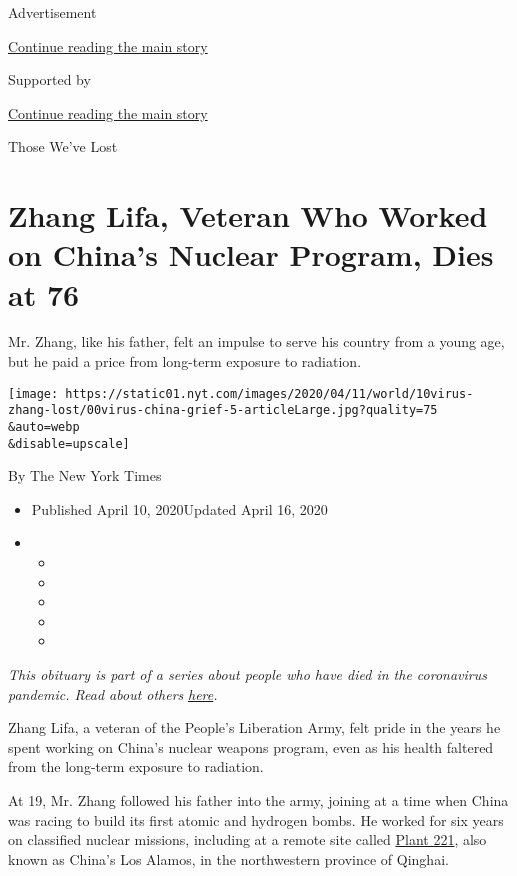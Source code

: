 Advertisement

\protect\hyperlink{after-top}{Continue reading the main story}

Supported by

\protect\hyperlink{after-sponsor}{Continue reading the main story}

Those We've Lost

\hypertarget{zhang-lifa-veteran-who-worked-on-chinas-nuclear-program-dies-at-76}{%
\section{Zhang Lifa, Veteran Who Worked on China's Nuclear Program, Dies
at
76}\label{zhang-lifa-veteran-who-worked-on-chinas-nuclear-program-dies-at-76}}

Mr. Zhang, like his father, felt an impulse to serve his country from a
young age, but he paid a price from long-term exposure to radiation.

\texttt{[image: https://static01.nyt.com/images/2020/04/11/world/10virus-zhang-lost/00virus-china-grief-5-articleLarge.jpg?quality=75\\\&auto=webp\\\&disable=upscale]}

By The New York Times

\begin{itemize}
\item
  Published April 10, 2020Updated April 16, 2020
\item
  \begin{itemize}
  \item
  \item
  \item
  \item
  \item
  \end{itemize}
\end{itemize}

\emph{This obituary is part of a series about people who have died in
the coronavirus pandemic. Read about others}
\href{https://www.nytimes.com/series/people-who-have-died-of-the-coronavirus}{\emph{here}}\emph{.}

Zhang Lifa, a veteran of the People's Liberation Army, felt pride in the
years he spent working on China's nuclear weapons program, even as his
health faltered from the long-term exposure to radiation.

At 19, Mr. Zhang followed his father into the army, joining at a time
when China was racing to build its first atomic and hydrogen bombs. He
worked for six years on classified nuclear missions, including at a
remote site called
\href{https://www.nytimes.com/2018/01/20/world/asia/china-jinyintan-atomic-city.html}{Plant
221}, also known as China's Los Alamos, in the northwestern province of
Qinghai.

